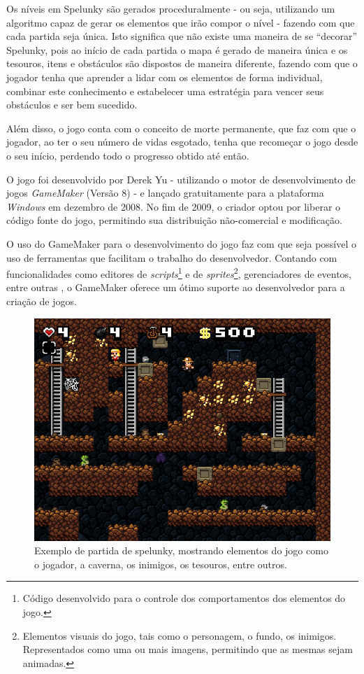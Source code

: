 Os níveis em Spelunky são gerados proceduralmente - ou seja, utilizando um
algoritmo capaz de gerar os elementos que irão compor o nível - fazendo com que
cada partida seja única. Isto significa que não existe uma maneira de se
``decorar'' Spelunky, pois ao início de cada partida o mapa é gerado de maneira
única e os tesouros, itens e obstáculos são dispostos de maneira diferente,
fazendo com que o jogador tenha que aprender a lidar com os elementos de forma
individual, combinar este conhecimento e estabelecer uma estratégia para vencer
seus obstáculos e ser bem sucedido.

Além disso, o jogo conta com o conceito de morte permanente, que faz com que o
jogador, ao ter o seu número de vidas esgotado, tenha que recomeçar o jogo desde
o seu início, perdendo todo o progresso obtido até então.

O jogo foi desenvolvido por Derek Yu - utilizando o motor de desenvolvimento de
jogos \textit{GameMaker} (Versão 8) - e lançado gratuitamente para a plataforma
\textit{Windows} em dezembro de 2008\cite{SPELUNKYRELEASE}. No fim de 2009, o
criador optou por liberar o código fonte do jogo, permitindo sua distribuição
não-comercial e modificação\cite{SPELUNKYLICENSE}.

O uso do GameMaker para o desenvolvimento do jogo faz com que seja possível o
uso de ferramentas que facilitam o trabalho do desenvolvedor. Contando com
funcionalidades como editores de \textit{scripts}\footnote{Código desenvolvido
para o controle dos comportamentos dos elementos do jogo.} e de
\textit{sprites}\footnote{Elementos visuais do jogo, tais como o personagem, o
fundo, os inimigos. Representados como uma ou mais imagens, permitindo que as
mesmas sejam animadas.}, gerenciadores de eventos, entre outras
\cite{GMAKER8DOCS}, o GameMaker oferece um ótimo suporte ao desenvolvedor para
a criação de jogos.

\begin{figure}[htb!]
\centering\includegraphics[width=.65\textwidth]{fig/spelunky-pc-screen.png}
\caption
    {\label{fig:spelunky-gameplay}Exemplo de partida de spelunky, mostrando
    elementos do jogo como o jogador, a caverna, os inimigos, os tesouros,
    entre outros.}
\end{figure}

